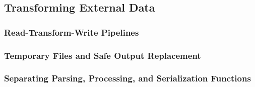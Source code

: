 \subsection{Transforming External Data}
\subsubsection{Read-Transform-Write Pipelines}
\subsubsection{Temporary Files and Safe Output Replacement}
\subsubsection{Separating Parsing, Processing, and Serialization Functions}
